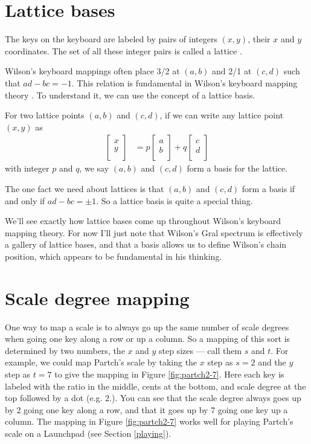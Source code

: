 \documentclass[a4paper,11pt]{article}
\begin{document}
\section{Lattice bases}
\label{bases}
The keys on the keyboard are labeled by pairs of integers $(x, y)$, their $x$
and $y$ coordinates. The set of all these integer pairs is called a lattice
\cite{cassels1959geometry, schrijver1998theory}.

Wilson's keyboard mappings often place 3/2 at $(a, b)$ and 2/1 at $(c, d)$ such
that $ad - bc = -1$. This relation is fundamental in Wilson's keyboard mapping
theory \cite{wilsondiophantine}. To understand it, we can use the concept of a
lattice basis.

For two lattice points $(a, b)$ and $(c, d)$, if we can write any lattice point
$(x, y)$ as
\begin{align}
\begin{bmatrix}
    x \\
    y \\
\end{bmatrix}
    &=
    p
\begin{bmatrix}
    a \\
    b \\
\end{bmatrix}
    +
    q
\begin{bmatrix}
    c \\
    d \\
\end{bmatrix}
\end{align}
with integer $p$ and $q$, we say $(a, b)$ and $(c, d)$ form a basis for the
lattice.

The one fact we need about lattices is that $(a, b)$ and $(c, d)$ form a basis
if and only if $ad - bc = \pm 1$. So a lattice basis is quite a special thing.

We'll see exactly how lattice bases come up throughout Wilson's keyboard
mapping theory. For now I'll just note that Wilson's Gral spectrum
\cite{wilsongralspectrum} is effectively a gallery of lattice bases, and that a
basis allows us to define Wilson's chain position, which appears to be
fundamental in his thinking.

\section{Scale degree mapping}
\label{sec:scale-degree-mapping}
One way to map a scale is to always go up the same number of scale degrees when
going one key along a row or up a column. So a mapping of this sort is
determined by two numbers, the $x$ and $y$ step sizes --- call them $s$ and
$t$. For example, we could map Partch's scale by taking the $x$ step as $s = 2$
and the $y$ step as $t = 7$ to give the mapping in Figure \ref{fig:partch2-7}.
Here each key is labeled with the ratio in the middle, cents at the bottom,
and scale degree at the top followed by a dot (e.g. $2.$). You can see that the
scale degree always goes up by 2 going one key along a row, and that it goes up
by 7 going one key up a column. The mapping in Figure \ref{fig:partch2-7} works
well for playing Partch's scale on a Launchpad (see Section \ref{playing}).
\end{document}
